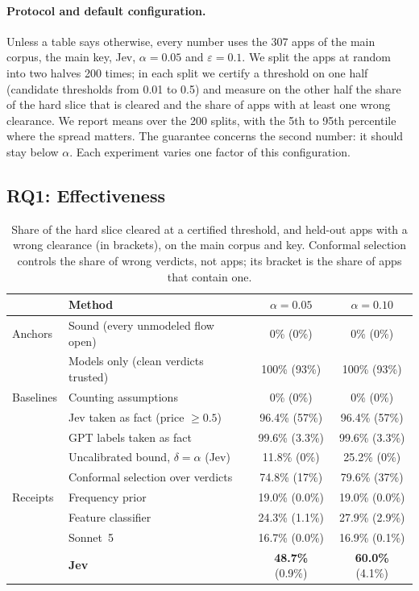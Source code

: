 \paragraph{Protocol and default configuration.}
Unless a table says otherwise, every number uses the 307 apps of the main corpus, the main key, Jev, $\alpha=0.05$ and $\varepsilon=0.1$.
We split the apps at random into two halves 200 times; in each split we certify a threshold on one half (candidate thresholds from 0.01 to 0.5) and measure on the other half the share of the hard slice that is cleared and the share of apps with at least one wrong clearance.
We report means over the 200 splits, with the 5th to 95th percentile where the spread matters.
The guarantee concerns the second number: it should stay below $\alpha$.
Each experiment varies one factor of this configuration.

\subsection{RQ1: Effectiveness}
\label{sec:rq1}

\begin{table}[t]
\caption{Share of the hard slice cleared at a certified threshold, and held-out apps with a wrong clearance (in brackets), on the main corpus and key. Conformal selection controls the share of wrong verdicts, not apps; its bracket is the share of apps that contain one.}
\label{tab:main}
\small
\begin{tabular}{@{}llcc@{}}
\toprule
 & Method & $\alpha=0.05$ & $\alpha=0.10$\\
\midrule
Anchors & Sound (every unmodeled flow open) & 0\% (0\%) & 0\% (0\%)\\
 & Models only (clean verdicts trusted) & 100\% (93\%) & 100\% (93\%)\\
\midrule
Baselines & Counting assumptions~\cite{bastani-oopsla15} & 0\% (0\%) & 0\% (0\%)\\
 & Jev taken as fact (price $\ge 0.5$) & 96.4\% (57\%) & 96.4\% (57\%)\\
 & GPT labels taken as fact & 99.6\% (3.3\%) & 99.6\% (3.3\%)\\
 & Uncalibrated bound, $\delta=\alpha$ (Jev) & 11.8\% (0\%) & 25.2\% (0\%)\\
 & Conformal selection over verdicts & 74.8\% (17\%) & 79.6\% (37\%)\\
\midrule
Receipts & Frequency prior & 19.0\% (0.0\%) & 19.0\% (0.0\%)\\
 & Feature classifier & 24.3\% (1.1\%) & 27.9\% (2.9\%)\\
 & Sonnet~5 & 16.7\% (0.0\%) & 16.9\% (0.1\%)\\
 & \textbf{Jev} & \textbf{48.7\%} (0.9\%) & \textbf{60.0\%} (4.1\%)\\
\bottomrule
\end{tabular}
\end{table}

